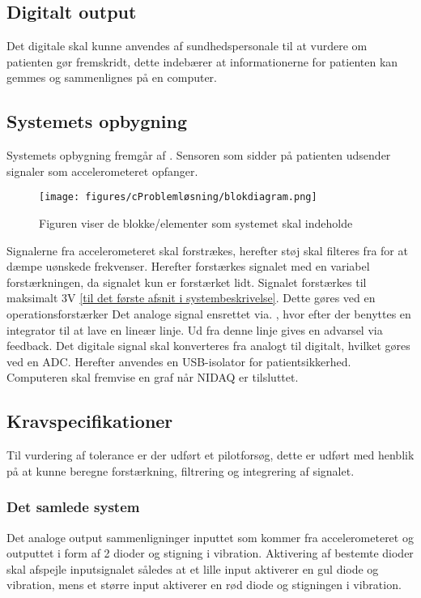 \subsection{Digitalt output}
Det digitale skal kunne anvendes af sundhedspersonale til at vurdere om patienten gør fremskridt, dette indebærer at informationerne for patienten kan gemmes og sammenlignes på en computer. 


\subsection{Systemets opbygning}
Systemets opbygning fremgår af . Sensoren som sidder på patienten udsender signaler som accelerometeret opfanger.

\begin{figure}[H]
	\centering
	\texttt{[image: figures/cProblemløsning/blokdiagram.png]}
	\caption{Figuren viser de blokke/elementer som systemet skal indeholde}
	\label{krav_blok}
\end{figure}

Signalerne fra accelerometeret skal forstrækes, herefter støj skal filteres fra for at dæmpe uønskede frekvenser. Herefter forstærkes signalet med en variabel forstærkningen, da signalet kun er forstærket lidt. Signalet forstærkes til maksimalt 3V \ref{til det første afsnit i systembeskrivelse}. Dette gøres ved en operationsforstærker  Det analoge signal ensrettet via. , hvor efter der benyttes en integrator til at lave en lineær linje. Ud fra denne linje gives en advarsel via feedback. Det digitale signal skal konverteres fra analogt til digitalt, hvilket gøres ved en ADC.  Herefter anvendes en USB-isolator for patientsikkerhed. Computeren skal fremvise en graf når NIDAQ er tilsluttet. 

\subsection{Kravspecifikationer}
Til vurdering af tolerance er der udført et pilotforsøg, dette er udført med henblik på at kunne beregne forstærkning, filtrering og integrering af signalet. 

\subsubsection{Det samlede system}
Det analoge output sammenligninger inputtet som kommer fra accelerometeret og outputtet i form af 2 dioder og stigning i vibration. Aktivering af bestemte dioder skal afspejle inputsignalet således at et lille input aktiverer en gul diode og vibration, mens et større input aktiverer en rød diode og stigningen i vibration. 

